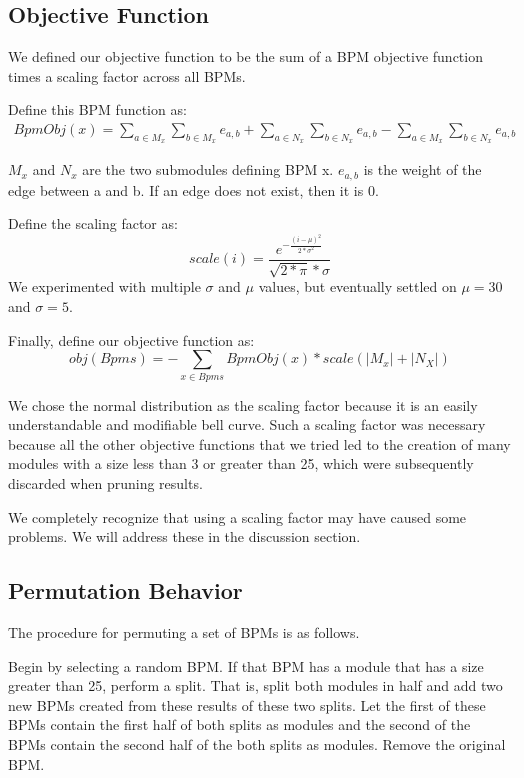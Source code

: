\documentclass[11pt]{article}
\begin{document}
\subsection{Objective Function}
We defined our objective function to be the sum of a BPM objective function times a scaling factor across all BPMs. 

Define this BPM function as:
\begin{align}
Bpm Obj(x) = \sum_{a \in M_x}^{}  \sum_{b \in M_x}^{} e_{a, b}  
		   + \sum_{a \in N_x}^{}  \sum_{b \in N_x}^{} e_{a, b}  
		   - \sum_{a \in M_x}^{}  \sum_{b \in N_x}^{} e_{a, b}              
\end{align}

$M_x$ and $N_x$ are the two submodules defining BPM x. $e_{a, b}$ is the weight of the edge between a and b. If an edge does not exist, then it is 0.

Define the scaling factor as:
$$scale(i) = \frac{e^{-\frac{(i - \mu) ^2}{2*\sigma^2}}}{\sqrt{2 * \pi} * \sigma}$$
We experimented with multiple $\sigma$ and  $\mu$ values, but eventually settled on $\mu = 30$ and $\sigma = 5$. 

Finally, define our objective function as:
$$obj(Bpms) = -\sum_{x \in Bpms}{} Bpm Obj(x) * scale(|M_x| + |N_X|) $$

\par We chose the normal distribution as the scaling factor because it is an easily understandable and modifiable bell curve. Such a scaling factor was necessary because all the other objective functions that we tried led to the creation of many modules with a size less than 3 or greater than 25, which were subsequently discarded when pruning results.

\par We completely recognize that using a scaling factor may have caused some problems. We will address these in the discussion section.


\subsection{Permutation Behavior}
\par The procedure for permuting a set of BPMs is as follows.
 
\par Begin by selecting a random BPM. If that BPM has a module that has a size greater than 25, perform a split. That is, split both modules in half and add two new BPMs created from these results of these two splits. Let the first of these BPMs contain the first half of both splits as modules and the second of the BPMs contain the second half of the both splits as modules. Remove the original BPM.
\end{document}
